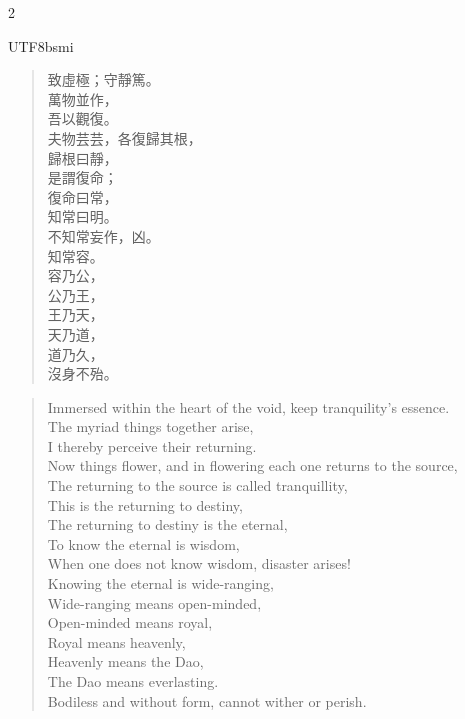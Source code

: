 \begin{paracol}{2}
\begin{CJK*}{UTF8}{bsmi}
\begin{verse}
致虛極；守靜篤。\\
萬物並作，\\
吾以觀復。\\
夫物芸芸，各復歸其根，\\
歸根曰靜，\\
是謂復命；\\
復命曰常，\\
知常曰明。\\
不知常妄作，凶。\\
知常容。\\
容乃公，\\
公乃王，\\
王乃天，\\
天乃道，\\
道乃久，\\
沒身不殆。
\end{verse}
\end{CJK*}
\switchcolumn
\begin{verse}
Immersed within the heart of the void, keep tranquility's essence.\\
The myriad things together arise,\\
I thereby perceive their returning.\\
Now things flower, and in flowering each one returns to the source,\\
The returning to the source is called tranquillity,\\
This is the returning to destiny,\\
The returning to destiny is the eternal,\\
To know the eternal is wisdom,\\
When one does not know wisdom, disaster arises!\\
Knowing the eternal is wide-ranging,\\
Wide-ranging means open-minded,\\
Open-minded means royal,\\
Royal means heavenly,\\
Heavenly means the Dao,\\
The Dao means everlasting.\\
Bodiless and without form, cannot wither or perish.
\end{verse}
\end{paracol}


